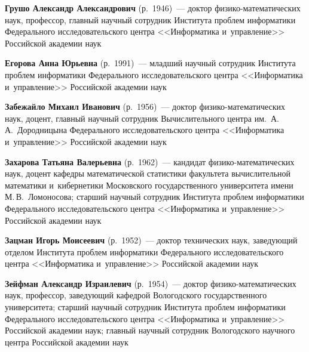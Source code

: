 \begin{multicols}{2}
\noindent
\textbf{Грушо Александр Александрович} (р.\ 1946)~--- доктор 
фи\-зи\-ко-ма\-те\-ма\-ти\-че\-ских наук, профессор, 
главный научный сотрудник Института проб\-лем информатики 
Федерального исследовательского цент\-ра <<Информатика и~управ\-ле\-ние>> Российской академии наук


\columnbreak

\noindent
\textbf{Егорова Анна Юрьевна} (р.\ 1991)~--- 
младший научный сотрудник Института проб\-лем информатики Федерального исследовательского цент\-ра 
<<Информатика и~управ\-ле\-ние>> Российской академии наук

\vspace*{3pt}




\noindent
\textbf{Забежайло Михаил Иванович} (р.\ 1956)~--- 
доктор фи\-зи\-ко-ма\-те\-ма\-ти\-че\-ских наук, доцент, 
главный научный со\-труд\-ник Вычислительного цент\-ра им.\ А.\,А.~Дородницына 
Федерального исследовательского цент\-ра <<Информатика и~управ\-ле\-ние>> Российской академии наук

\vspace*{3pt}

\noindent
\textbf{Захарова Татьяна Валерьевна} (р.\ 1962)~--- кандидат 
фи\-зи\-ко-ма\-те\-ма\-ти\-че\-ских наук, доцент ка\-фед\-ры 
математической статистики факультета вы\-чис\-ли\-тель\-ной математики 
и~кибернетики Московского государственного университета имени М.\,В.~Ломоносова; 
старший научный со\-труд\-ник Института проб\-лем информатики Федерального 
исследовательского цент\-ра <<Информатика и~управ\-ле\-ние>> Российской академии наук

\vspace*{3pt}

\noindent
\textbf{Зацман Игорь Моисеевич} (р.\ 1952)~--- 
доктор тех\-нических наук, за\-ве\-ду\-ющий отделом Института проб\-лем 
информатики Федерального исследовательского цент\-ра <<Информатика и~управ\-ле\-ние>>
 Российской академии наук

\vspace*{3pt}

\noindent
\textbf{Зейфман Александр Израилевич} (р.\ 1954)~--- доктор фи\-зи\-ко-ма\-те\-ма\-ти\-че\-ских наук, 
профессор, заведующий кафедрой Вологодского государственного университета;
 старший научный сотрудник Института проб\-лем информатики Федерального исследовательского цент\-ра 
 <<Информатика и~управ\-ле\-ние>> Российской академии наук; 
 главный научный сотрудник Вологодского научного центра Российской академии наук



\end{multicols}
